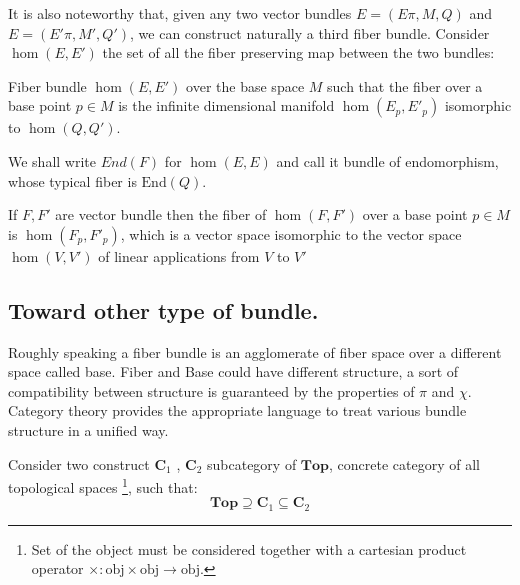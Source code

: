 \documentclass[a4paper,12pt]{scrartcl}    %
\begin{document}
It is also noteworthy that, given any two vector bundles $E =(E\pi,M,Q)$ and $E =(E'\pi,M',Q')$, we can construct 	naturally a third fiber bundle.
Consider $\hom(E,E')$ the set of all the fiber preserving map between the two bundles:
\begin{definition}
	Fiber bundle $\hom(E,E')$ over the base space $M$ such that the fiber over a base point $p\in M$ is the infinite dimensional manifold $\hom(E_p,E'_p)$ isomorphic to $\hom(Q,Q')$.
\end{definition}
	\begin{notationfix}
	We shall write $End(F)$ for $\hom(E,E)$ and call it bundle of endomorphism, whose typical fiber is $\textrm{End}(Q)$.
	\end{notationfix}

	\begin{remark}
		If $F,F'$ are vector bundle then the fiber of  $\hom(F,F')$ over a base point $p\in M$ is $\hom(F_p,F'_p)$, which is a vector space isomorphic to the vector space $\hom(V,V')$ of linear applications from $V$ to $V'$
	\end{remark}

\subsection{Toward other type of bundle.}
Roughly speaking a fiber bundle is an agglomerate of fiber space over a different space called base. Fiber and Base could have different structure, a sort of compatibility between structure is guaranteed by the properties of $\pi$ and $\chi$.
Category theory provides the appropriate language to treat various bundle structure in a unified way.

Consider two construct $\mathbf{C}_{1}$ , $\mathbf{C}_{2}$ subcategory of $\mathbf{Top}$, concrete category of all topological spaces \footnote{Set of the object must be considered together with a cartesian product operator $\times : \textrm{obj} \times \textrm{obj} \rightarrow \textrm{obj}$.}, such that:
\begin{displaymath}
\mathbf{Top} \supseteq \mathbf{C}_{1} \subseteq \mathbf{C}_{2}
\end{displaymath}
\end{document}
